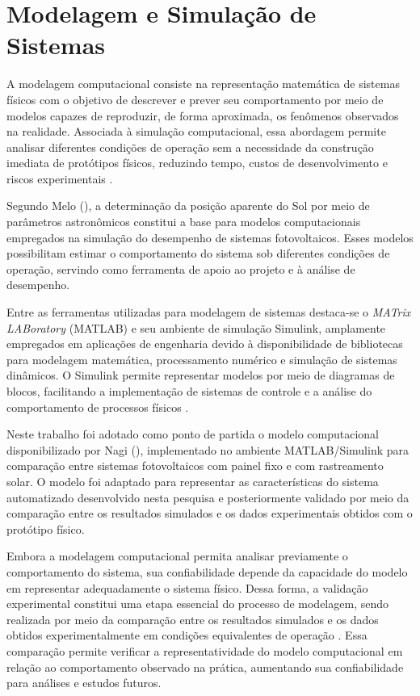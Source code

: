 \section{Modelagem e Simulação de Sistemas}

A modelagem computacional consiste na representação matemática de sistemas físicos com o objetivo de descrever e prever seu comportamento por meio de modelos capazes de reproduzir, de forma aproximada, os fenômenos observados na realidade. Associada à simulação computacional, essa abordagem permite analisar diferentes condições de operação sem a necessidade da construção imediata de protótipos físicos, reduzindo tempo, custos de desenvolvimento e riscos experimentais \cite{dvorak2023}.

Segundo Melo (\citeyear{melo2019}), a determinação da posição aparente do Sol por meio de parâmetros astronômicos constitui a base para modelos computacionais empregados na simulação do desempenho de sistemas fotovoltaicos. Esses modelos possibilitam estimar o comportamento do sistema sob diferentes condições de operação, servindo como ferramenta de apoio ao projeto e à análise de desempenho.

Entre as ferramentas utilizadas para modelagem de sistemas destaca-se o \textit{MATrix LABoratory} (MATLAB) e seu ambiente de simulação Simulink, amplamente empregados em aplicações de engenharia devido à disponibilidade de bibliotecas para modelagem matemática, processamento numérico e simulação de sistemas dinâmicos. O Simulink permite representar modelos por meio de diagramas de blocos, facilitando a implementação de sistemas de controle e a análise do comportamento de processos físicos \cite{mathworks_simulink}.

Neste trabalho foi adotado como ponto de partida o modelo computacional disponibilizado por Nagi (\citeyear{nagi2023}), implementado no ambiente MATLAB/Simulink para comparação entre sistemas fotovoltaicos com painel fixo e com rastreamento solar. O modelo foi adaptado para representar as características do sistema automatizado desenvolvido nesta pesquisa e posteriormente validado por meio da comparação entre os resultados simulados e os dados experimentais obtidos com o protótipo físico.

Embora a modelagem computacional permita analisar previamente o comportamento do sistema, sua confiabilidade depende da capacidade do modelo em representar adequadamente o sistema físico. Dessa forma, a validação experimental constitui uma etapa essencial do processo de modelagem, sendo realizada por meio da comparação entre os resultados simulados e os dados obtidos experimentalmente em condições equivalentes de operação \cite{dvorak2023}. Essa comparação permite verificar a representatividade do modelo computacional em relação ao comportamento observado na prática, aumentando sua confiabilidade para análises e estudos futuros.

